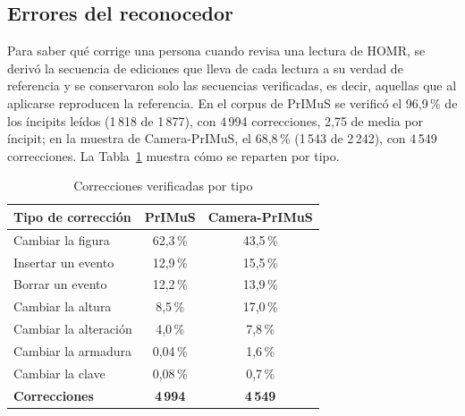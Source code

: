 \documentclass[conference]{IEEEtran}
\begin{document}
\subsection{Errores del reconocedor}

Para saber qué corrige una persona cuando revisa una lectura de HOMR, se
derivó la secuencia de ediciones que lleva de cada lectura a su verdad de
referencia y se conservaron solo las secuencias verificadas, es decir,
aquellas que al aplicarse reproducen la referencia. En el corpus de PrIMuS
se verificó el 96,9\,\% de los íncipits leídos (1\,818 de 1\,877), con
4\,994 correcciones, 2,75 de media por íncipit; en la muestra de
Camera-PrIMuS, el 68,8\,\% (1\,543 de 2\,242), con 4\,549 correcciones.
La Tabla~\ref{tab:tipos-error} muestra cómo se reparten por tipo.

\begin{table}[htbp]
\caption{Correcciones verificadas por tipo}
\label{tab:tipos-error}
\centering
\footnotesize
\begin{tabular}{|l|c|c|}
\hline
\textbf{Tipo de corrección} & \textbf{PrIMuS} & \textbf{Camera-PrIMuS} \\
\hline
Cambiar la figura & 62,3\,\% & 43,5\,\% \\
\hline
Insertar un evento & 12,9\,\% & 15,5\,\% \\
\hline
Borrar un evento & 12,2\,\% & 13,9\,\% \\
\hline
Cambiar la altura & 8,5\,\% & 17,0\,\% \\
\hline
Cambiar la alteración & 4,0\,\% & 7,8\,\% \\
\hline
Cambiar la armadura & 0,04\,\% & 1,6\,\% \\
\hline
Cambiar la clave & 0,08\,\% & 0,7\,\% \\
\hline
\textbf{Correcciones} & \textbf{4\,994} & \textbf{4\,549} \\
\hline
\end{tabular}
\end{table}
\end{document}
